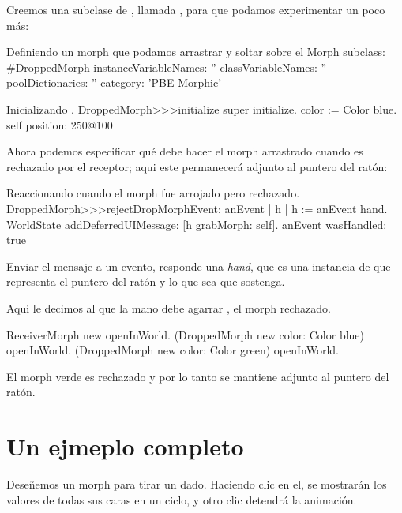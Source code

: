 \documentclass[a4paper,10pt,twoside]{book}
\begin{document}
Creemos una subclase de , llamada , para que podamos experimentar un poco m\'as:

\begin{classdef}{Definiendo un morph que podamos arrastrar y soltar sobre el }
Morph subclass: #DroppedMorph
	instanceVariableNames: ''
	classVariableNames: ''
	poolDictionaries: ''
	category: 'PBE-Morphic'
\end{classdef}

\begin{method}{Inicializando .}
DroppedMorph>>>initialize
	super initialize.
	color := Color blue.
	self position: 250@100
\end{method}

Ahora podemos especificar qu\'e debe hacer el morph arrastrado cuando es rechazado por el receptor; aqui este permanecer\'a adjunto al puntero del rat\'on:

\begin{method}{Reaccionando cuando el morph fue arrojado pero rechazado.}
DroppedMorph>>>rejectDropMorphEvent: anEvent
	| h |
	h := anEvent hand.
	WorldState
		addDeferredUIMessage: [h grabMorph: self].
	anEvent wasHandled: true
\end{method}

Enviar el mensaje  a un evento, responde una \emph{hand}, que es una instancia de  que representa el puntero del rat\'on y lo que sea que sostenga.

Aqui le decimos al  que la mano debe agarrar , el morph rechazado.

\begin{code}{}
ReceiverMorph new openInWorld.
(DroppedMorph new color: Color blue) openInWorld.
(DroppedMorph new color: Color green) openInWorld.
\end{code}
\noindent
El morph verde es rechazado y por lo tanto se mantiene adjunto al puntero del rat\'on.

\section{Un ejmeplo completo}

Dese\~nemos un morph para tirar un dado. Haciendo clic en el, se mostrar\'an los valores de todas sus caras en un ciclo, y otro clic detendr\'a la animaci\'on.
\end{document}
